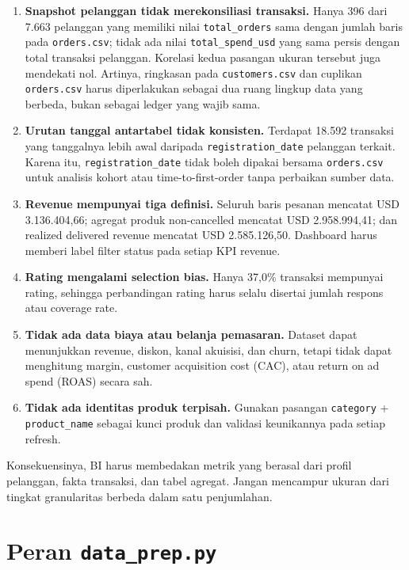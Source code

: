 \documentclass[
  indonesian,
  letterpaper,
  DIV=11,
  numbers=noendperiod]{scrreprt}
\providecommand{\tightlist}{%
  \setlength{\itemsep}{0pt}\setlength{\parskip}{0pt}}
\begin{document}
\begin{enumerate}
\def\labelenumi{\arabic{enumi}.}
\tightlist
\item
  \textbf{Snapshot pelanggan tidak merekonsiliasi transaksi.} Hanya 396
  dari 7.663 pelanggan yang memiliki nilai \texttt{total\_orders} sama
  dengan jumlah baris pada \texttt{orders.csv}; tidak ada nilai
  \texttt{total\_spend\_usd} yang sama persis dengan total transaksi
  pelanggan. Korelasi kedua pasangan ukuran tersebut juga mendekati nol.
  Artinya, ringkasan pada \texttt{customers.csv} dan cuplikan
  \texttt{orders.csv} harus diperlakukan sebagai dua ruang lingkup data
  yang berbeda, bukan sebagai ledger yang wajib sama.
\item
  \textbf{Urutan tanggal antartabel tidak konsisten.} Terdapat 18.592
  transaksi yang tanggalnya lebih awal daripada
  \texttt{registration\_date} pelanggan terkait. Karena itu,
  \texttt{registration\_date} tidak boleh dipakai bersama
  \texttt{orders.csv} untuk analisis kohort atau time-to-first-order
  tanpa perbaikan sumber data.
\item
  \textbf{Revenue mempunyai tiga definisi.} Seluruh baris pesanan
  mencatat USD 3.136.404,66; agregat produk non-cancelled mencatat USD
  2.958.994,41; dan realized delivered revenue mencatat USD
  2.585.126,50. Dashboard harus memberi label filter status pada setiap
  KPI revenue.
\item
  \textbf{Rating mengalami selection bias.} Hanya 37,0\% transaksi
  mempunyai rating, sehingga perbandingan rating harus selalu disertai
  jumlah respons atau coverage rate.
\item
  \textbf{Tidak ada data biaya atau belanja pemasaran.} Dataset dapat
  menunjukkan revenue, diskon, kanal akuisisi, dan churn, tetapi tidak
  dapat menghitung margin, customer acquisition cost (CAC), atau return
  on ad spend (ROAS) secara sah.
\item
  \textbf{Tidak ada identitas produk terpisah.} Gunakan pasangan
  \texttt{category} + \texttt{product\_name} sebagai kunci produk dan
  validasi keunikannya pada setiap refresh.
\end{enumerate}

Konsekuensinya, BI harus membedakan metrik yang berasal dari profil
pelanggan, fakta transaksi, dan tabel agregat. Jangan mencampur ukuran
dari tingkat granularitas berbeda dalam satu penjumlahan.

\section*{\texorpdfstring{Peran
\texttt{data\_prep.py}}{Peran data\_prep.py}}\label{peran-data_prep.py}
\end{document}
